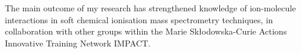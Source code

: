 The main outcome of my research has strengthened knowledge of ion-molecule interactions in soft chemical ionisation mass spectrometry techniques, in collaboration with other groups within the Marie Sk\l{}odowska-Curie Actions Innovative Training Network IMPACT.















